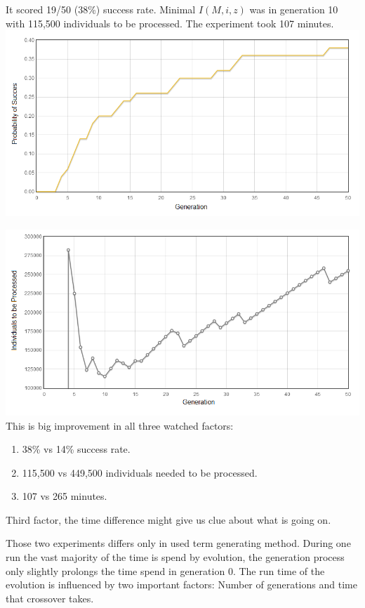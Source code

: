 \documentclass[12pt,a4paper]{report}
\begin{document}
It scored 19/50 (38\%) success rate. 
Minimal $I(M,i,z)$ was in generation 10 
with 115,500 individuals to be processed.
The experiment took 107 minutes.\\

\includegraphics[scale=0.65]{reports/Ant/1/probabs.png}

\includegraphics[scale=0.65]{reports/Ant/1/indivs.png}\\

This is big improvement in all three watched factors:

\begin{enumerate}
 \item 38\% vs 14\% success rate.
 \item 115,500 vs 449,500 individuals needed to be processed.
 \item 107 vs 265 minutes.  
\end{enumerate}

Third factor, the time difference might give us clue about what is going on.

Those two experiments differs only in used term generating method.
During one run the vast majority of the time is spend by evolution,
the generation process only slightly prolongs the time spend in generation 0.
The run time of the evolution is influenced by two important factors:
Number of generations and time that crossover takes.
\end{document}
